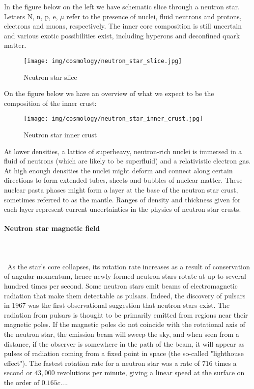 	
	In the figure below on the left we have schematic slice through a neutron star. Letters N, n, p, e, $\mu$ refer to the presence of nuclei, fluid neutrons and protons, electrons and muons, respectively. The inner core composition is still uncertain and various exotic possibilities exist, including hyperons and deconfined quark matter. 
	\begin{figure}[H]
		\centering
		\texttt{[image: img/cosmology/neutron\_star\_slice.jpg]}	
		\caption{Neutron star slice}
	\end{figure}
	On the figure below we have an overview of what we expect to be the composition of the inner crust:
	\begin{figure}[H]
		\centering
		\texttt{[image: img/cosmology/neutron\_star\_inner\_crust.jpg]}	
		\caption{Neutron star inner crust}
	\end{figure}
	At lower densities, a lattice of superheavy, neutron-rich nuclei is immersed in a fluid of neutrons (which are likely to be superfluid) and a relativistic electron gas. At high enough densities the nuclei might deform and connect along certain directions to form extended tubes, sheets and bubbles of nuclear matter. These nuclear pasta phases might form a layer at the base of the neutron star crust, sometimes referred to as the mantle. Ranges of density and thickness given for each layer represent current uncertainties in the physics of neutron star crusts.
	
	
	\paragraph{Neutron star magnetic field}\mbox{}\\\\\
	As the star's core collapses, its rotation rate increases as a result of conservation of angular momentum, hence newly formed neutron stars rotate at up to several hundred times per second. Some neutron stars emit beams of electromagnetic radiation that make them detectable as pulsars. Indeed, the discovery of pulsars in 1967 was the first observational suggestion that neutron stars exist. The radiation from pulsars is thought to be primarily emitted from regions near their magnetic poles. If the magnetic poles do not coincide with the rotational axis of the neutron star, the emission beam will sweep the sky, and when seen from a distance, if the observer is somewhere in the path of the beam, it will appear as pulses of radiation coming from a fixed point in space (the so-called "lighthouse effect"). The fastest rotation rate for a neutron star was a rate of $716$ times a second or $43,000$ revolutions per minute, giving a linear speed at the surface on the order of $0.165 c$....
	
